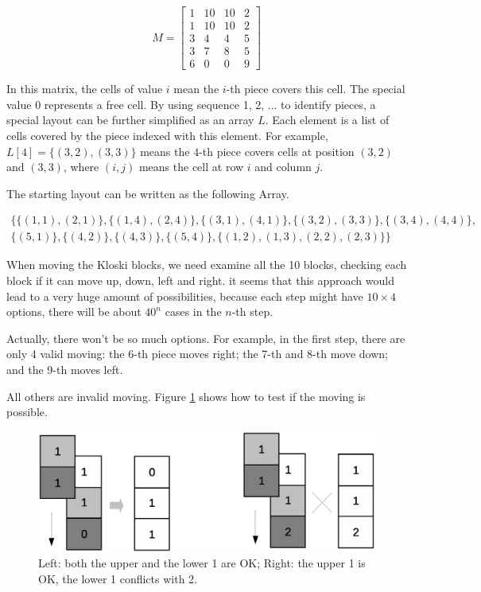 \documentclass[UTF8]{article}
\begin{document}
\[
M = \left [
  \begin{array}{cccc}
  1 & 10 & 10 & 2 \\
  1 & 10 & 10 & 2 \\
  3 & 4 & 4 & 5 \\
  3 & 7 & 8 & 5 \\
  6 & 0 & 0 & 9
  \end{array}
\right ]
\]

In this matrix, the cells of value $i$ mean the $i$-th piece covers this cell. The special
value 0 represents a free cell. By using sequence 1, 2, ... to identify pieces, a special
layout can be further simplified as an array $L$. Each element is a list of cells covered by
the piece indexed with this element.
For example, $L[4] = \{(3, 2), (3, 3)\}$ means the $4$-th piece covers cells at
position $(3, 2)$ and $(3, 3)$, where $(i, j)$ means the cell at row $i$ and column $j$.

The starting layout can be written as the following Array.

\[
\begin{array}{l}
\{ \{(1, 1), (2, 1) \},
 \{(1, 4), (2, 4) \},
 \{(3, 1), (4, 1) \},
 \{(3, 2), (3, 3) \},
 \{(3, 4), (4, 4) \}, \\
 \{(5, 1) \},
 \{(4, 2) \},
 \{(4, 3) \},
 \{(5, 4) \},
 \{(1, 2), (1, 3), (2, 2), (2, 3) \} \}
\end{array}
\]

When moving the Kloski blocks, we need examine all the 10 blocks, checking each block if
it can move up, down, left and right. it seems that this approach would lead to a very huge
amount of possibilities, because each step might have $10 \times 4$ options, there will be
about $40^n$ cases in the $n$-th step.

Actually, there won't be so much options. For example, in the first step, there are only 4
valid moving: the 6-th piece moves right; the 7-th and 8-th move down; and the 9-th moves left.

All others are invalid moving. Figure \ref{fig:klotski-valid-move} shows how to test if the
moving is possible.

\begin{figure}[htbp]
 \centering
 \includegraphics[scale=0.4]{img/klotski-valid-move.eps}
 \caption{Left: both the upper and the lower 1 are OK; Right: the upper 1 is OK, the lower 1 conflicts with 2.}
 \label{fig:klotski-valid-move}
\end{figure}
\end{document}
